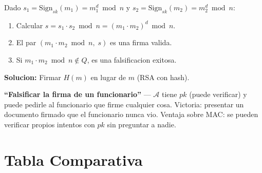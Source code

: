 \documentclass[a4paper,11pt]{article}
\begin{document}
\vspace{0.3cm}

\begin{attackbox}[title={Patron de Ataque -- RSA: Maleabilidad multiplicativa}]
Dado $s_1 = \mathrm{Sign}_{sk}(m_1) = m_1^d \bmod n$ y $s_2 = \mathrm{Sign}_{sk}(m_2) = m_2^d \bmod n$:
\begin{enumerate}[leftmargin=*, label=\textbf{\arabic*.}]
  \item Calcular $s = s_1 \cdot s_2 \bmod n = (m_1 \cdot m_2)^d \bmod n$.
  \item El par $(m_1 \cdot m_2 \bmod n,\; s)$ es una firma valida.
  \item Si $m_1 \cdot m_2 \bmod n \notin Q$, es una falsificacion exitosa.
\end{enumerate}
\textbf{Solucion:} Firmar $H(m)$ en lugar de $m$ (RSA con hash).
\end{attackbox}

\begin{hookbox}
\textbf{``Falsificar la firma de un funcionario''} --- $\mathcal{A}$ tiene $pk$ (puede verificar) y puede pedirle al funcionario que firme cualquier cosa. Victoria: presentar un documento firmado que el funcionario nunca vio. Ventaja sobre MAC: se pueden verificar propios intentos con $pk$ sin preguntar a nadie.
\end{hookbox}

\section{Tabla Comparativa}
\end{document}
